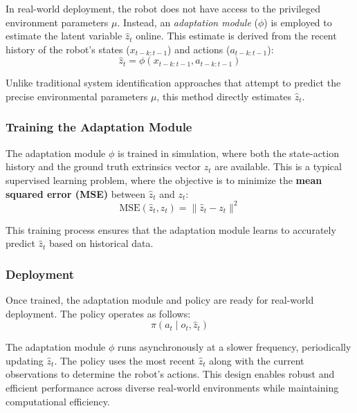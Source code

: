 In real-world deployment, the robot does not have access to the privileged environment parameters $\mu$. Instead, an \emph{adaptation module} ($\phi$) is employed to estimate the latent variable $\hat{z}_t$ online. This estimate is derived from the recent history of the robot's states ($x_{t-k:t-1}$) and actions ($a_{t-k:t-1}$):
\begin{equation}
	\hat{z}_t = \phi(x_{t-k:t-1}, a_{t-k:t-1})
\end{equation}

Unlike traditional system identification approaches that attempt to predict the precise environmental parameters $\mu$, this method directly estimates $\hat{z}_t$.

\subsubsection{Training the Adaptation Module}

The adaptation module $\phi$ is trained in simulation, where both the state-action history and the ground truth extrinsics vector $z_t$ are available. This is a typical supervised learning problem, where the objective is to minimize the \textbf{mean squared error (MSE)} between $\hat{z}_t$ and $z_t$:
\begin{equation}
	\text{MSE}(\hat{z}_t, z_t) = \| \hat{z}_t - z_t \|^2
\end{equation}

This training process ensures that the adaptation module learns to accurately predict $\hat{z}_t$ based on historical data.

\subsubsection{Deployment}

Once trained, the adaptation module and policy are ready for real-world deployment. The policy operates as follows:
\begin{equation}
	\pi(a_t \mid o_t, \hat{z}_t)
\end{equation}

The adaptation module $\phi$ runs asynchronously at a slower frequency, periodically updating $\hat{z}_t$. The policy uses the most recent $\hat{z}_t$ along with the current observations to determine the robot's actions. This design enables robust and efficient performance across diverse real-world environments while maintaining computational efficiency.

